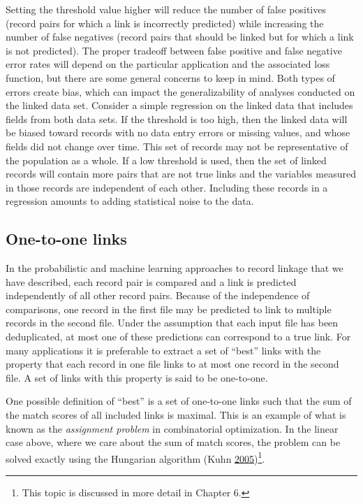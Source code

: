 \documentclass[]{krantz}
\begin{document}
Setting the threshold value higher will reduce the number of false
positives (record pairs for which a link is incorrectly predicted) while
increasing the number of false negatives (record pairs that should be
linked but for which a link is not predicted). The proper tradeoff
between false positive and false negative error rates will depend on the
particular application and the associated loss function, but there are
some general concerns to keep in mind. Both types of errors create bias,
which can impact the generalizability of analyses conducted on the
linked data set. Consider a simple regression on the linked data that
includes fields from both data sets. If the threshold is too high, then
the linked data will be biased toward records with no data entry errors
or missing values, and whose fields did not change over time. This set
of records may not be representative of the population as a whole. If a
low threshold is used, then the set of linked records will contain more
pairs that are not true links and the variables measured in those
records are independent of each other. Including these records in a
regression amounts to adding statistical noise to the data.

\subsection{One-to-one links}\label{one-to-one-links}

In the probabilistic and machine learning approaches to record linkage
that we have described, each record pair is compared and a link is
predicted independently of all other record pairs. Because of the
independence of comparisons, one record in the first file may be
predicted to link to multiple records in the second file. Under the
assumption that each input file has been deduplicated, at most one of
these predictions can correspond to a true link. For many applications
it is preferable to extract a set of ``best'' links with the property
that each record in one file links to at most one record in the second
file. A set of links with this property is said to be one-to-one.

One possible definition of ``best'' is a set of one-to-one links such
that the sum of the match scores of all included links is maximal. This
is an example of what is known as the \emph{assignment problem} in
combinatorial optimization. In the linear case above, where we care
about the sum of match scores, the problem can be solved exactly using
the Hungarian algorithm (Kuhn
\protect\hyperlink{ref-kuhn2005hungarian}{2005})\footnote{This topic is
  discussed in more detail in Chapter 6.}.
\end{document}
